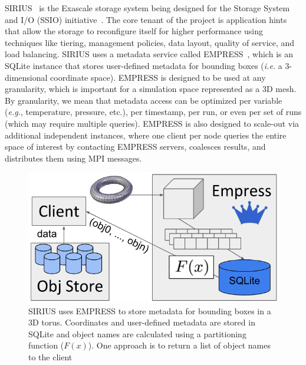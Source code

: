 SIRIUS~\cite{klasky:journal16-sirius} is the Exascale storage system being
designed for the Storage System and I/O (SSIO)
initiative~\cite{ross:report14-ssio}. The core tenant of the project is
application hints that allow the storage to reconfigure itself for higher
performance using techniques like tiering, management policies, data layout,
quality of service, and load balancing.  SIRIUS uses a metadata service called
EMPRESS~\cite{lawson:pdsw17-empress}, which is an SQLite instance
that stores user-defined metadata for bounding boxes ({\it i.e.} a
3-dimensional coordinate space).  EMPRESS is designed to be used at any
granularity, which is important for a simulation space represented as a 3D
mesh. By granularity, we mean that metadata access can be optimized per
variable ({\it e.g.}, temperature, pressure, etc.), per timestamp, per run, or
even per set of runs (which may require multiple queries).  EMPRESS is also
designed to scale-out via additional independent instances, where one client
per node queries the entire space of interest by contacting EMPRESS servers,
coalesces results, and distributes them using MPI messages.


\begin{figure}[tb]
\centering
  \includegraphics[width=0.8\linewidth]{figures/empress.png}
  \caption{SIRIUS uses EMPRESS to store metadata for bounding boxes in a 3D
torus. Coordinates and user-defined metadata are stored in SQLite and object
names are calculated using a partitioning function (\(F(x)\)). One approach is to
return a list of object names to the client}
  \label{fig:empress}
\end{figure}

